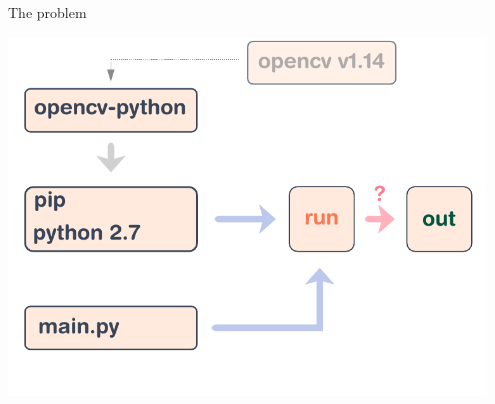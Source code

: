 \documentclass[a4paper]{beamer}
\begin{document}
\begin{frame}{The problem}
    \begin{center}
        \includegraphics[width=0.95\textwidth]{img/schema-build.pdf}
    \end{center}
\end{frame}
\end{document}
